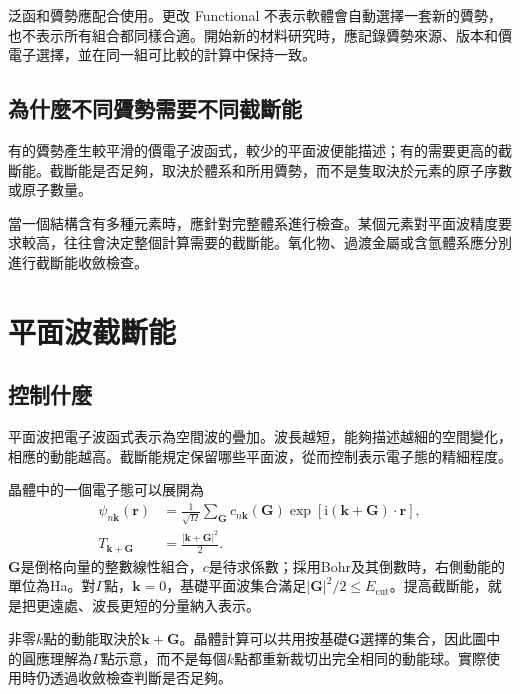 泛函和贗勢應配合使用。更改 Functional 不表示軟體會自動選擇一套新的贗勢，也不表示所有組合都同樣合適。開始新的材料研究時，應記錄贗勢來源、版本和價電子選擇，並在同一組可比較的計算中保持一致。

\subsection{為什麼不同贗勢需要不同截斷能}

有的贗勢產生較平滑的價電子波函式，較少的平面波便能描述；有的需要更高的截斷能。截斷能是否足夠，取決於體系和所用贗勢，而不是隻取決於元素的原子序數或原子數量。

當一個結構含有多種元素時，應針對完整體系進行檢查。某個元素對平面波精度要求較高，往往會決定整個計算需要的截斷能。氧化物、過渡金屬或含氫體系應分別進行截斷能收斂檢查。

\section{平面波截斷能}

\subsection{ 控制什麼}

平面波把電子波函式表示為空間波的疊加。波長越短，能夠描述越細的空間變化，相應的動能越高。截斷能規定保留哪些平面波，從而控制表示電子態的精細程度。


晶體中的一個電子態可以展開為
\begin{equation}
  \begin{aligned}
  \psi_{n\mathbf k}(\mathbf r)
   &=\frac{1}{\sqrt{\Omega}}\sum_{\mathbf G}
      c_{n\mathbf k}(\mathbf G)
      \exp\!\left[\mathrm i(\mathbf k+\mathbf G)\cdot\mathbf r\right],\\
  T_{\mathbf k+\mathbf G}&=\frac{|\mathbf k+\mathbf G|^2}{2}.
  \end{aligned}
  \label{eq:plane-wave-expansion}
\end{equation}
$\mathbf G$是倒格向量的整數線性組合，$c$是待求係數；採用Bohr及其倒數時，右側動能的單位為Ha。對$\Gamma$點，$\mathbf k=0$，基礎平面波集合滿足$|\mathbf G|^2/2\leq E_{\mathrm{cut}}$。提高截斷能，就是把更遠處、波長更短的分量納入表示。



非零$k$點的動能取決於$\mathbf k+\mathbf G$。晶體計算可以共用按基礎$\mathbf G$選擇的集合，因此圖中的圓應理解為$\Gamma$點示意，而不是每個$k$點都重新裁切出完全相同的動能球。實際使用時仍透過收斂檢查判斷是否足夠。


